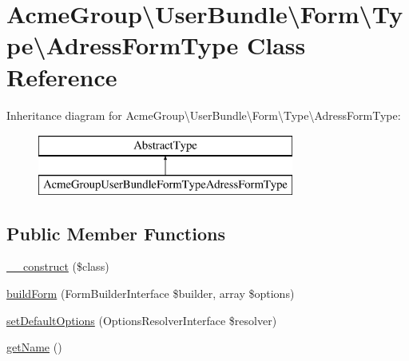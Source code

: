 \hypertarget{class_acme_group_1_1_user_bundle_1_1_form_1_1_type_1_1_adress_form_type}{\section{Acme\+Group\textbackslash{}User\+Bundle\textbackslash{}Form\textbackslash{}Type\textbackslash{}Adress\+Form\+Type Class Reference}
\label{class_acme_group_1_1_user_bundle_1_1_form_1_1_type_1_1_adress_form_type}
}
Inheritance diagram for Acme\+Group\textbackslash{}User\+Bundle\textbackslash{}Form\textbackslash{}Type\textbackslash{}Adress\+Form\+Type\+:\begin{figure}[H]
\begin{center}
\leavevmode
\includegraphics[height=2.000000cm]{class_acme_group_1_1_user_bundle_1_1_form_1_1_type_1_1_adress_form_type}
\end{center}
\end{figure}
\subsection*{Public Member Functions}
\begin{DoxyCompactItemize}
\item 
\hyperlink{class_acme_group_1_1_user_bundle_1_1_form_1_1_type_1_1_adress_form_type_ab72b661846577d8b455ff743c361c83b}{\+\_\+\+\_\+construct} (\$class)
\item 
\hyperlink{class_acme_group_1_1_user_bundle_1_1_form_1_1_type_1_1_adress_form_type_a737cb5d21a34f669f071f2755cc636f5}{build\+Form} (Form\+Builder\+Interface \$builder, array \$options)
\item 
\hyperlink{class_acme_group_1_1_user_bundle_1_1_form_1_1_type_1_1_adress_form_type_a746441c345d80b8724e2f3d8f57c8234}{set\+Default\+Options} (Options\+Resolver\+Interface \$resolver)
\item 
\hyperlink{class_acme_group_1_1_user_bundle_1_1_form_1_1_type_1_1_adress_form_type_adc4a06ea80bfe78924379c32895f11b9}{get\+Name} ()
\end{DoxyCompactItemize}


